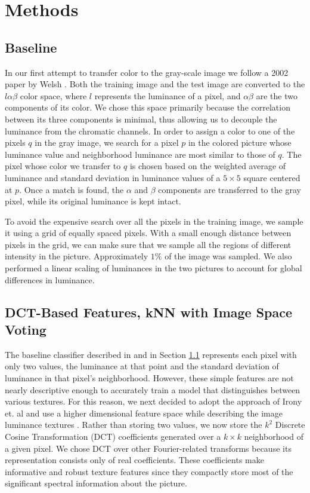 \section{Methods}
\label{sec:methods}

\subsection{Baseline}
\label{sec:baseline}
In our first attempt to transfer color to the gray-scale image we follow a 2002 paper by Welsh \cite{Welsh02}. Both the training image and the test image are converted to the $l\alpha\beta$ color space, where $l$ represents the luminance of a pixel, and $\alpha\beta$ are the two components of its color. We chose this space primarily because the correlation between its three components is minimal, thus allowing us to decouple the luminance from the chromatic channels. In order to assign a color to one of the pixels $q$ in the gray image, we search for a pixel $p$ in the colored picture whose luminance value and neighborhood luminance are most similar to those of $q$. The pixel whose color we transfer to $q$ is chosen based on the weighted average of luminance and standard deviation in luminance values of a $5\times5$ square centered at $p$. Once a match is found, the $\alpha$ and $\beta$ components are transferred to the gray pixel, while its original luminance is kept intact. 

To avoid the expensive search over all the pixels in the training image, we sample it using a grid of equally spaced pixels. With a small enough distance between pixels in the grid, we can make sure that we sample all the regions of different intensity in the picture. Approximately $1\%$ of the image was sampled. We also performed a linear scaling of luminances in the two pictures to account for global differences in luminance. 

\subsection{DCT-Based Features, kNN with Image Space Voting}
\label{sec:dct}
The baseline classifier described in \cite{Welsh02} and in Section \ref{sec:baseline} represents each pixel with only two values, the luminance at that point and the standard deviation of luminance in that pixel's neighborhood.  However, these simple features are not nearly descriptive enough to accurately train a model that distinguishes between various textures.  For this reason, we next decided to adopt the approach of Irony et. al and use a higher dimensional feature space while describing the image luminance textures \cite{Irony05}.  Rather than storing two values, we now store the $k^2$ Discrete Cosine Transformation (DCT) coefficients generated over a $k \times k$ neighborhood of a given pixel. We chose DCT over other Fourier-related transforms because its representation consists only of real coefficients.  These coefficients make informative and robust texture features since they compactly store most of the significant spectral information about the picture.

